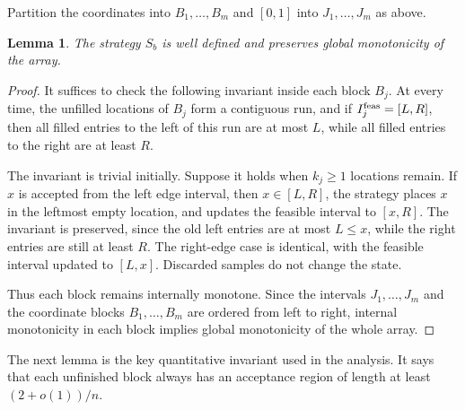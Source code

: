 \documentclass[11pt,reqno,letterpaper]{amsart}
\newtheorem{lemma}[theorem]{Lemma}
\theoremstyle{definition}
\numberwithin{equation}{section}
\begin{document}
\begin{algorithm}[t]
\caption{The strategy \(S_b\)}
\label{alg:block-strategy}
\DontPrintSemicolon
Partition the coordinates into \(B_1,\dots,B_m\) and \([0,1]\) into \(J_1,\dots,J_m\) as above.\;
\end{algorithm}


\begin{lemma}\label{lem:strategy-admissible}
The strategy \(S_b\) is well defined and preserves global monotonicity of the array.
\end{lemma}

\begin{proof}
It suffices to check the following invariant inside each block \(B_j\). At every time, the unfilled locations of \(B_j\) form a contiguous run, and if \(I_j^{\rm feas}=[L,R]\), then all filled entries to the left of this run are at most \(L\), while all filled entries to the right are at least \(R\).

The invariant is trivial initially. Suppose it holds when \(k_j\ge1\) locations remain. If \(x\) is accepted from the left edge interval, then \(x\in[L,R]\), the strategy places \(x\) in the leftmost empty location, and updates the feasible interval to \([x,R]\). The invariant is preserved, since the old left entries are at most \(L\le x\), while the right entries are still at least \(R\). The right-edge case is identical, with the feasible interval updated to \([L,x]\). Discarded samples do not change the state.

Thus each block remains internally monotone. Since the intervals \(J_1,\dots,J_m\) and the coordinate blocks \(B_1,\dots,B_m\) are ordered from left to right, internal monotonicity in each block implies global monotonicity of the whole array.
\end{proof}


The next lemma is the key quantitative invariant used in the analysis. It says that each unfinished block always has an acceptance region of length at least \((2+o(1))/n\).
\end{document}
